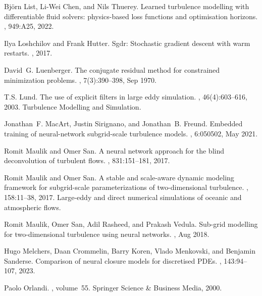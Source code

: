 \documentclass[preprint]{elsarticle}
\begin{document}
\begin{thebibliography}{10}
Björn List, Li-Wei Chen, and Nils Thuerey.
\newblock Learned turbulence modelling with differentiable fluid solvers: physics-based loss functions and optimisation horizons.
, 949:A25, 2022.

Ilya Loshchilov and Frank Hutter.
\newblock Sgdr: Stochastic gradient descent with warm restarts.
, 2017.

David~G. Luenberger.
\newblock The conjugate residual method for constrained minimization problems.
, 7(3):390–398, Sep 1970.

T.S. Lund.
\newblock The use of explicit filters in large eddy simulation.
, 46(4):603--616, 2003.
\newblock Turbulence Modelling and Simulation.

Jonathan~F. MacArt, Justin Sirignano, and Jonathan~B. Freund.
\newblock Embedded training of neural-network subgrid-scale turbulence models.
, 6:050502, May 2021.

Romit Maulik and Omer San.
\newblock A neural network approach for the blind deconvolution of turbulent flows.
, 831:151--181, 2017.

Romit Maulik and Omer San.
\newblock A stable and scale-aware dynamic modeling framework for subgrid-scale parameterizations of two-dimensional turbulence.
, 158:11--38, 2017.
\newblock Large-eddy and direct numerical simulations of oceanic and atmospheric flows.

Romit Maulik, Omer San, Adil Rasheed, and Prakash Vedula.
\newblock Sub-grid modelling for two-dimensional turbulence using neural networks.
, Aug 2018.

Hugo Melchers, Daan Crommelin, Barry Koren, Vlado Menkovski, and Benjamin Sanderse.
\newblock Comparison of neural closure models for discretised {PDE}s.
, 143:94--107, 2023.

Paolo Orlandi.
, volume~55.
\newblock Springer Science \& Business Media, 2000.


\end{thebibliography}
\end{document}
